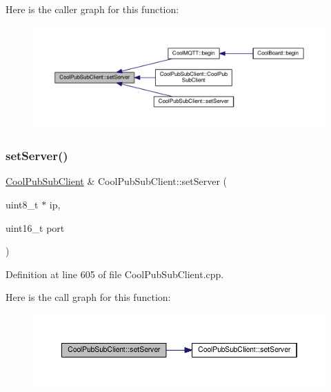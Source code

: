 Here is the caller graph for this function\+:
\nopagebreak
\begin{figure}[H]
\begin{center}
\leavevmode
\includegraphics[width=350pt]{class_cool_pub_sub_client_a947e70c394c66c7d08d0c53caf8425e3_icgraph}
\end{center}
\end{figure}
\mbox{\label{class_cool_pub_sub_client_ad589f977fc2799b9341dc5f4fcdb483a}} 
\subsubsection{\texorpdfstring{set\+Server()}{setServer()}\hspace{0.1cm}{\footnotesize\ttfamily [2/3]}}
{\footnotesize\ttfamily \hyperlink{class_cool_pub_sub_client}{Cool\+Pub\+Sub\+Client} \& Cool\+Pub\+Sub\+Client\+::set\+Server (\begin{DoxyParamCaption}\item[{uint8\+\_\+t $\ast$}]{ip,  }\item[{uint16\+\_\+t}]{port }\end{DoxyParamCaption})}



Definition at line 605 of file Cool\+Pub\+Sub\+Client.\+cpp.

Here is the call graph for this function\+:
\nopagebreak
\begin{figure}[H]
\begin{center}
\leavevmode
\includegraphics[width=350pt]{class_cool_pub_sub_client_ad589f977fc2799b9341dc5f4fcdb483a_cgraph}
\end{center}
\end{figure}
\mbox{\label{class_cool_pub_sub_client_a333ea9369dc88bb14d3fa6216e731c09}} 
